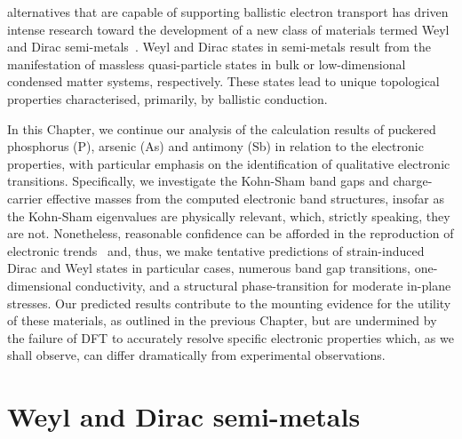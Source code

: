 
 alternatives 
that are capable of supporting 
ballistic electron transport 
has driven intense research 
toward the development of a 
new class of materials termed   
Weyl and Dirac semi-metals~\cite{Xuaaa9297,PhysRevLett.102.166803,Shekhar2015,PhysRevB.83.205101,NIELSEN1983389,turner2013beyond,PhysRevX.4.031035,PhysRevLett.108.140405,PhysRevB.85.195320,PhysRevB.88.125427,C3CP53257G,doi:10.1093/nsr/nwu080,Weyl1929,doi:10.1146/annurev-conmatphys-031016-025458,C3CP53257G,doi:10.1093/nsr/nwu080}.
%
Weyl and Dirac states 
in semi-metals  
result from the 
manifestation of massless quasi-particle states in 
bulk or low-dimensional 
condensed matter systems, respectively.
%
These states lead to unique topological properties 
characterised, primarily, 
by ballistic conduction.

In this Chapter, 
we continue our analysis  
of the calculation results of 
puckered phosphorus (P), arsenic (As) and antimony (Sb)
in relation to the electronic properties, 
with particular emphasis 
on the identification 
of qualitative electronic transitions.
%
Specifically, 
we investigate the Kohn-Sham band gaps and 
charge-carrier effective masses
from the computed electronic band structures, 
insofar as the Kohn-Sham eigenvalues 
are physically relevant, 
which, strictly speaking, 
they are not.
%
Nonetheless, 
reasonable confidence can be afforded 
in the reproduction of 
electronic trends~\cite{1402-4896-2004-T109-001,doi:10.1021/cr200107z}
and, thus, we make tentative predictions 
of strain-induced Dirac and  
Weyl states in particular cases, 
numerous band gap transitions,  
one-dimensional conductivity, 
and a structural phase-transition 
for moderate in-plane stresses.
%
%
Our predicted results contribute to the 
mounting evidence for the 
utility of these materials, 
as outlined in the previous Chapter, 
but are undermined by 
the failure of DFT to accurately resolve 
specific electronic properties 
which, as we shall observe, 
can differ dramatically from 
experimental observations.


\section{Weyl and Dirac semi-metals}
\label{sec:weyl_and_dirac}

